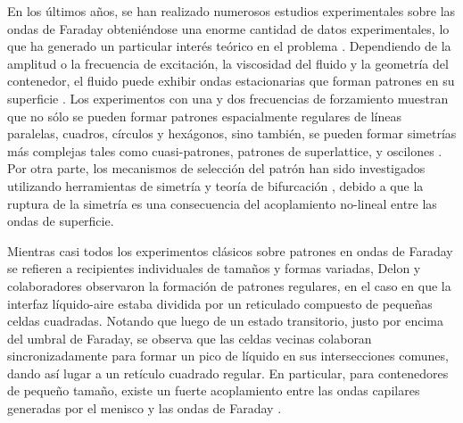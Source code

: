 En los últimos años, se han realizado numerosos estudios experimentales sobre las ondas de Faraday \cite{residori2007two} obteniéndose una enorme cantidad de datos experimentales, lo que ha generado un particular interés teórico en el problema \cite{perinet2009numerical, perinet2012alternating}. Dependiendo de la amplitud o la frecuencia de excitación, la viscosidad del fluido y la geometría del contenedor, el fluido puede exhibir ondas estacionarias que forman patrones en su superficie \cite{arbell2000temporally, rajchenbach2011new}. Los experimentos con una y dos frecuencias de forzamiento muestran que no sólo se pueden formar patrones espacialmente regulares de líneas paralelas, cuadros, círculos y hexágonos, sino también, se pueden formar simetrías más complejas tales como cuasi-patrones, patrones de superlattice, y oscilones \cite{westra2003patterns, rajchenbach2013observation}. Por otra parte, los mecanismos de selección del patrón han sido investigados utilizando herramientas de simetría y teoría de bifurcación \cite{buescu2012bifurcation, skeldon2007pattern}, debido a que la ruptura de la simetría es una consecuencia del acoplamiento no-lineal entre las ondas de superficie. \medskip \bigskip

Mientras casi todos los experimentos clásicos sobre patrones en ondas de Faraday se refieren a recipientes individuales de tamaños y formas variadas, Delon y colaboradores \cite{Delon2010b} observaron la formación de patrones regulares, en el caso en que la interfaz líquido-aire estaba dividida por un reticulado compuesto de pequeñas celdas cuadradas. Notando que luego de un estado transitorio, justo por encima del umbral de Faraday, se observa que las celdas vecinas colaboran sincronizadamente para formar un pico de líquido en sus intersecciones comunes, dando así lugar a un retículo cuadrado regular. En particular, para contenedores de pequeño tamaño, existe un fuerte acoplamiento entre las ondas capilares generadas por el menisco y las ondas de Faraday \cite{Pena-Polo2014, Pena-Polo2017}. \medskip \bigskip


